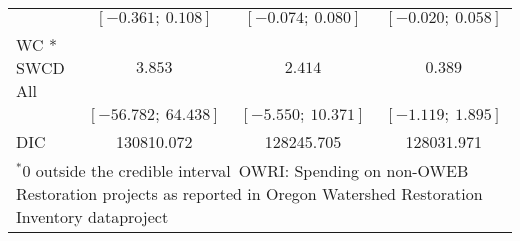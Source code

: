 \begin{table}
\begin{center}
\begin{tabular}{l c c c }
                   & $[-0.361;\ 0.108]$   & $[-0.074;\ 0.080]$   & $[-0.020;\ 0.058]$  \\
WC * SWCD All      & $3.853$              & $2.414$              & $0.389$             \\
                   & $[-56.782;\ 64.438]$ & $[-5.550;\ 10.371]$  & $[-1.119;\ 1.895]$  \\
\hline
DIC                & 130810.072           & 128245.705           & 128031.971          \\
\hline
\multicolumn{4}{l}{\scriptsize{$^* 0$ outside the credible interval\
       OWRI: Spending on non-OWEB Restoration projects as reported in Oregon Watershed Restoration Inventory dataproject}}
\end{tabular}
\label{table:projectmods}
\end{center}
\end{table}
